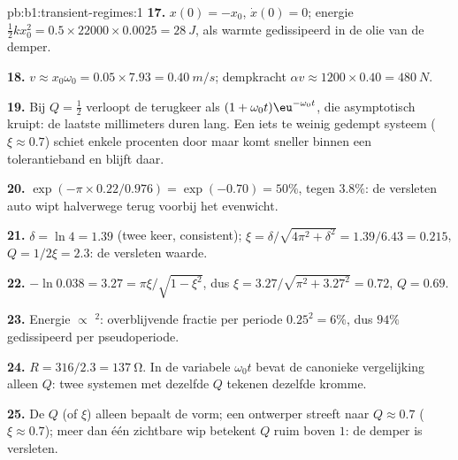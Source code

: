 \begin{solution}{pb:b1:transient-regimes:1}
\textbf{17.} $x(0) = -x_0$, $\dot x(0) = 0$; energie $\tfrac12 kx_0^2 =
0.5 \times 22000 \times 0.0025 = \qty{28}{J}$, als warmte gedissipeerd in de
olie van de demper.

\textbf{18.} $v \approx x_0\omega_0 = 0.05 \times 7.93 = \qty{0.40}{m/s}$;
dempkracht $\alpha v \approx 1200 \times 0.40 = \qty{480}{N}$.

\textbf{19.} Bij $Q = \tfrac12$ verloopt de terugkeer als $(1 + \omega_0 t)\eu^{-\omega_0
t}$, die asymptotisch kruipt: de laatste millimeters duren lang. Een
iets te weinig gedempt systeem ($\xi \approx 0.7$) schiet enkele
procenten door maar komt sneller binnen een tolerantieband en blijft daar.

\textbf{20.} $\exp(-\pi \times 0.22/0.976) = \exp(-0.70) = 50\%$, tegen
$3.8\%$: de versleten auto wipt halverwege terug voorbij het evenwicht.

\textbf{21.} $\delta = \ln 4 = 1.39$ (twee keer, consistent); $\xi =
\delta/\sqrt{4\pi^2 + \delta^2} = 1.39/6.43 = 0.215$, $Q = 1/2\xi = 2.3$:
de versleten waarde.

\textbf{22.} $-\ln 0.038 = 3.27 = \pi\xi/\sqrt{1 - \xi^2}$, dus $\xi =
3.27/\sqrt{\pi^2 + 3.27^2} = 0.72$, $Q = 0.69$.

\textbf{23.} Energie $\propto$ $^2$: overblijvende fractie per
periode $0.25^2 = 6\%$, dus $94\%$ gedissipeerd per pseudoperiode.

\textbf{24.} $R = 316/2.3 = \qty{137}{\ohm}$. In de variabele $\omega_0 t$
bevat de canonieke vergelijking alleen $Q$: twee systemen met dezelfde $Q$
tekenen dezelfde kromme.

\textbf{25.} De  $Q$ (of $\xi$) alleen bepaalt de vorm; een
ontwerper streeft naar $Q \approx 0.7$ ($\xi \approx 0.7$); meer dan één
zichtbare wip betekent $Q$ ruim boven $1$: de demper is versleten.
\end{solution}
